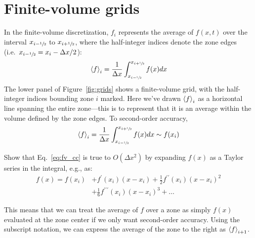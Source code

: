 \section{Finite-volume grids}

In the finite-volume discretization, $f_i$ represents the average of
$f(x,t)$ over the interval $x_{i-{\sfrac{1}{2}}}$ to $x_{i+{\sfrac{1}{2}}}$, where
the half-integer indices denote the zone edges (i.e.\ $x_{i-{\sfrac{1}{2}}} =
x_i - \Delta x/2$):
\begin{equation}
\label{eq:fv_cc-a}
{\langle f\rangle}_i = \frac{1}{\Delta x} \int_{x_{i-{\sfrac{1}{2}}}}^{x_{i+{\sfrac{1}{2}}}} f(x) dx
\end{equation}
The lower panel of Figure~\ref{fig:grids} shows a finite-volume grid,
with the half-integer indices bounding zone $i$ marked.
%
%
Here we've drawn ${\langle f\rangle}_i$ as a horizontal line spanning the entire zone---this
is to represent that it is an average within the volume defined by the zone
edges.
%
To second-order accuracy,
\begin{equation}
\label{eq:fv_cc}
{\langle f\rangle}_i = \frac{1}{\Delta x} \int_{x_{i-{\sfrac{1}{2}}}}^{x_{i+{\sfrac{1}{2}}}} f(x) dx \sim f(x_i)
\end{equation}

\begin{exercise}
{Show that Eq.~\ref{eq:fv_cc} is true to $O(\Delta x^2)$ by expanding
$f(x)$ as a Taylor series in the integral, e.g., as:
\begin{align}
f(x) = f(x_i) &+ f^\prime(x_i) (x - x_i) + \frac{1}{2} f^{\prime\prime}(x_i) (x - x_i)^2 \nonumber \\
%
 &+ \frac{1}{6} f^{\prime\prime\prime}(x_i) (x - x_i)^3 + \ldots
\end{align}
}
\end{exercise}

This means that we can treat the average of $f$ over a zone as simply
$f(x)$ evaluated at the zone center if we only want second-order
accuracy.  Using the subscript notation, we can express the average of
the zone to the right as ${\langle f\rangle}_{i+1}$.

